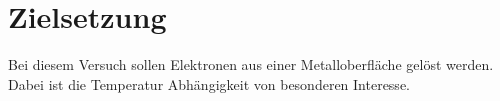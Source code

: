 \section{Zielsetzung}
\label{sec:Zielsetzung}

Bei diesem Versuch sollen Elektronen aus einer Metalloberfläche gelöst werden.
Dabei ist die Temperatur Abhängigkeit von besonderen Interesse.